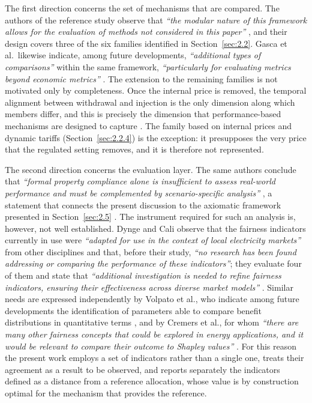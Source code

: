 The first direction concerns the set of mechanisms that are compared. The authors of the reference study observe that \textit{``the modular nature of this framework allows for the evaluation of methods not considered in this paper''} \cite{gonzalezAsenjo2026}, and their design covers three of the six families identified in Section~\ref{sec:2.2}. Gasca et al.\ likewise indicate, among future developments, \textit{``additional types of comparisons''} within the same framework, \textit{``particularly for evaluating metrics beyond economic metrics''} \cite{gasca2024}. The extension to the remaining families is not motivated only by completeness. Once the internal price is removed, the temporal alignment between withdrawal and injection is the only dimension along which members differ, and this is precisely the dimension that performance-based mechanisms are designed to capture \cite{gianaroli2024, giudice2026}. The family based on internal prices and dynamic tariffs (Section~\ref{sec:2.2.4}) is the exception: it presupposes the very price that the regulated setting removes, and it is therefore not represented.

The second direction concerns the evaluation layer. The same authors conclude that \textit{``formal property compliance alone is insufficient to assess real-world performance and must be complemented by scenario-specific analysis''} \cite{gonzalezAsenjo2026}, a statement that connects the present discussion to the axiomatic framework presented in Section~\ref{sec:2.5} \cite{gonzalezAsenjo2025}. The instrument required for such an analysis is, however, not well established. Dynge and Cali observe that the fairness indicators currently in use were \textit{``adapted for use in the context of local electricity markets''} from other disciplines and that, before their study, \textit{``no research has been found addressing or comparing the performance of these indicators''}; they evaluate four of them and state that \textit{``additional investigation is needed to refine fairness indicators, ensuring their effectiveness across diverse market models''} \cite{dynge2025}. Similar needs are expressed independently by Volpato et al., who indicate among future developments the identification of parameters able to compare benefit distributions in quantitative terms \cite{volpato2024}, and by Cremers et al., for whom \textit{``there are many other fairness concepts that could be explored in energy applications, and it would be relevant to compare their outcome to Shapley values''} \cite{cremers2023}. For this reason the present work employs a set of indicators rather than a single one, treats their agreement as a result to be observed, and reports separately the indicators defined as a distance from a reference allocation, whose value is by construction optimal for the mechanism that provides the reference.

